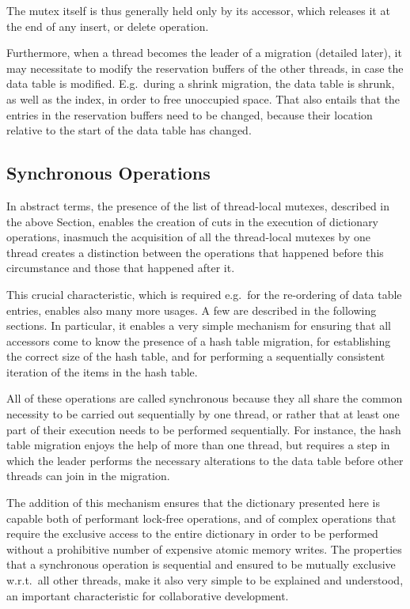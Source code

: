 The mutex itself is thus generally held only by its accessor, which releases it at the end of any insert, or delete operation.

Furthermore, when a thread becomes the leader of a migration (detailed later), it may necessitate to modify the reservation buffers of the other threads, in case the data table is modified.
E.g.\ during a shrink migration, the data table is shrunk, as well as the index, in order to free unoccupied space.
That also entails that the entries in the reservation buffers need to be changed, because their location relative to the start of the data table has changed.


\subsection{Synchronous Operations}\label{subsec:synchronous-operations}

In abstract terms, the presence of the list of thread-local mutexes, described in the above Section, enables the creation of cuts in the execution of dictionary operations, inasmuch the acquisition of all the thread-local mutexes by one thread creates a distinction between the operations that happened before this circumstance and those that happened after it.

This crucial characteristic, which is required e.g.\ for the re-ordering of data table entries, enables also many more usages.
A few are described in the following sections.
In particular, it enables a very simple mechanism for ensuring that all accessors come to know the presence of a hash table migration, for establishing the correct size of the hash table, and for performing a sequentially consistent iteration of the items in the hash table.

All of these operations are called synchronous because they all share the common necessity to be carried out sequentially by one thread, or rather that at least one part of their execution needs to be performed sequentially.
For instance, the hash table migration enjoys the help of more than one thread, but requires a step in which the leader performs the necessary alterations to the data table before other threads can join in the migration.

The addition of this mechanism ensures that the dictionary presented here is capable both of performant lock-free operations, and of complex operations that require the exclusive access to the entire dictionary in order to be performed without a prohibitive number of expensive atomic memory writes.
The properties that a synchronous operation is sequential and ensured to be mutually exclusive w.r.t.\ all other threads, make it also very simple to be explained and understood, an important characteristic for collaborative development.

